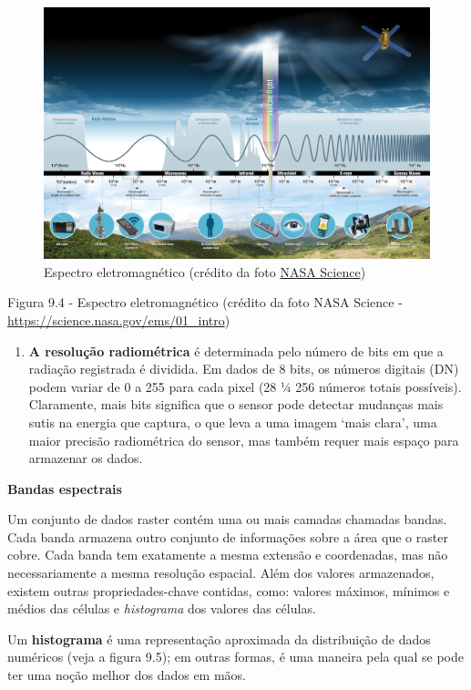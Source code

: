 \documentclass[
]{book}
\providecommand{\tightlist}{%
  \setlength{\itemsep}{0pt}\setlength{\parskip}{0pt}}
\begin{document}
\begin{figure}
\centering
\includegraphics{media/modulo9/fig94.png}
\caption{Espectro eletromagnético (crédito da foto \href{https://science.nasa.gov/ems/01_intro}{NASA Science})}
\end{figure}

Figura 9.4 - Espectro eletromagnético (crédito da foto NASA Science - \url{https://science.nasa.gov/ems/01_intro})

\begin{enumerate}
\def\labelenumi{\arabic{enumi}.}
\setcounter{enumi}{3}
\tightlist
\item
  \textbf{A resolução radiométrica} é determinada pelo número de bits em que a radiação registrada é dividida. Em dados de 8 bits, os números digitais (DN) podem variar de 0 a 255 para cada pixel (28 ¼ 256 números totais possíveis). Claramente, mais bits significa que o sensor pode detectar mudanças mais sutis na energia que captura, o que leva a uma imagem `mais clara', uma maior precisão radiométrica do sensor, mas também requer mais espaço para armazenar os dados.
\end{enumerate}

\textbf{Bandas espectrais}

Um conjunto de dados raster contém uma ou mais camadas chamadas bandas. Cada banda armazena outro conjunto de informações sobre a área que o raster cobre. Cada banda tem exatamente a mesma extensão e coordenadas, mas não necessariamente a mesma resolução espacial. Além dos valores armazenados, existem outras propriedades-chave contidas, como: valores máximos, mínimos e médios das células e \emph{histograma} dos valores das células.

Um \textbf{histograma} é uma representação aproximada da distribuição de dados numéricos (veja a figura 9.5); em outras formas, é uma maneira pela qual se pode ter uma noção melhor dos dados em mãos.
\end{document}
